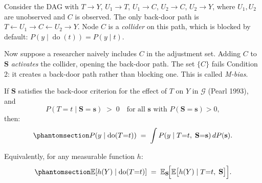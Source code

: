 \documentclass[
  a4paper,
]{book}
\newcommand{\doop}{\operatorname{do}}
\newcommand{\E}{\mathbb{E}}
\newcommand{\Gcal}{\mathcal{G}}
\begin{document}
\begin{tcolorbox}[enhanced jigsaw, arc=.35mm, bottomrule=.15mm, bottomtitle=1mm, breakable, colback=white, colbacktitle=quarto-callout-warning-color!10!white, colframe=quarto-callout-warning-color-frame, coltitle=black, left=2mm, leftrule=.75mm, opacityback=0, opacitybacktitle=0.6, rightrule=.15mm, title={Why Condition 2 Can Be Violated by a Collider: M-Bias}, titlerule=0mm, toprule=.15mm, toptitle=1mm]

Consider the DAG with \(T \to Y\), \(U_1 \to T\), \(U_1 \to C\),
\(U_2 \to C\), \(U_2 \to Y\), where \(U_1, U_2\) are unobserved and
\(C\) is observed. The only back-door path is
\(T \leftarrow U_1 \to C \leftarrow U_2 \to Y\). Node \(C\) is a
\emph{collider} on this path, which is blocked by default:
\(P(y \mid \doop(t)) = P(y \mid t)\).

Now suppose a researcher naively includes \(C\) in the adjustment set.
Adding \(C\) to \(\mathbf{S}\) \emph{activates} the collider, opening
the back-door path. The set \(\{C\}\) fails Condition 2: it creates a
back-door path rather than blocking one. This is called \emph{M-bias}.

\end{tcolorbox}

\begin{tcolorbox}[enhanced jigsaw, arc=.35mm, bottomrule=.15mm, bottomtitle=1mm, breakable, colback=white, colbacktitle=quarto-callout-tip-color!10!white, colframe=quarto-callout-tip-color-frame, coltitle=black, left=2mm, leftrule=.75mm, opacityback=0, opacitybacktitle=0.6, rightrule=.15mm, title={Theorem: Back-Door Adjustment Formula}, titlerule=0mm, toprule=.15mm, toptitle=1mm]

If \(\mathbf{S}\) satisfies the back-door criterion for the effect of
\(T\) on \(Y\) in \(\Gcal\) (Pearl 1993), and
\[P(T{=}t \mid \mathbf{S}{=}\mathbf{s}) \;>\; 0 \quad \text{for all } \mathbf{s} \text{ with } P(\mathbf{S}{=}\mathbf{s}) > 0, \tag{positivity}\]
then:
\begin{equation}\protect\phantomsection\label{eq-backdoor}{P\!\left(y \mid \doop(T{=}t)\right) \;=\; \int P(y \mid T{=}t,\;\mathbf{S}{=}\mathbf{s})\,dP(\mathbf{s}).}\end{equation}

Equivalently, for any measurable function \(h\):
\begin{equation}\protect\phantomsection\label{eq-backdoor-exp}{\E\!\left[h(Y) \mid \doop(T{=}t)\right] \;=\; \E_{\mathbf{S}}\!\Bigl[\E\bigl[h(Y) \mid T{=}t,\;\mathbf{S}\bigr]\Bigr].}\end{equation}

\end{tcolorbox}
\end{document}
